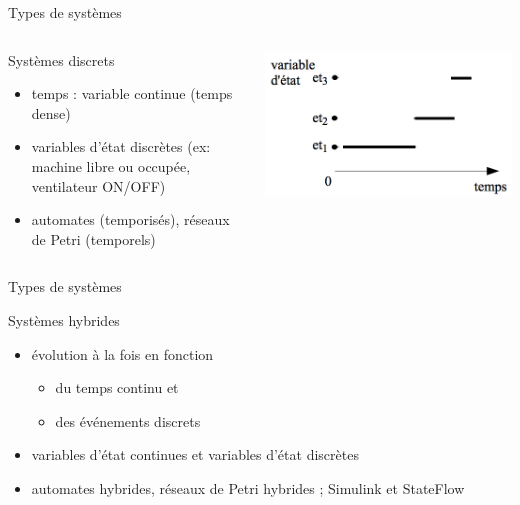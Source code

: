 \documentclass[compress]{beamer}
\begin{document}
\begin{frame}{Types de systèmes}
\begin{columns}
	\begin{block}{Systèmes discrets}
	\begin{itemize}
	\item temps : variable continue (temps dense)
	\item variables d'état discrètes (ex: machine libre ou occupée, ventilateur ON/OFF)
	\item automates (temporisés), réseaux de Petri (temporels)
	\end{itemize}
	\end{block}
	\includegraphics[width=.9\linewidth]{discret1}
\end{columns}
\end{frame}

\begin{frame}{Types de systèmes}
\begin{block}{Systèmes hybrides}
	\begin{itemize}
	\item évolution à la fois en fonction 
		\begin{itemize}
		\item du temps continu  et
		\item des événements discrets
		\end{itemize}
	\item  variables d'état continues et  variables d'état discrètes
	\item automates hybrides, réseaux de Petri hybrides ; Simulink et  StateFlow
	\end{itemize}
\end{block}
\end{frame}

\end{document}
